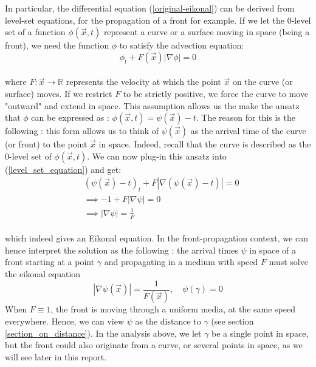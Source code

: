 \documentclass[11pt]{article}
\theoremstyle{definition}
\theoremstyle{remark}
\newcommand{\R}{\mathbb{R}}
\begin{document}
\noindent In particular, the differential equation (\ref{original-eikonal}) can be derived from level-set equations, for the propagation of a front for example. If we let the 0-level set of a function $\phi(\vec{x},t)$ represent a curve or a surface moving in space (being a front), we need the function $\phi$ to satisfy the advection equation: \\
\begin{equation}
\label{level_set_equation}
    \phi_t+F(\vec{x})|\nabla \phi| =0
\end{equation} \\
where $F:\vec{x}\rightarrow\R$ represents the velocity at which the point $\vec{x}$ on the curve (or surface) moves. If we restrict $F$ to be strictly positive, we force the curve to move "outward" and extend in space. This assumption allows us the make the ansatz that $\phi$ can be expressed as : $\phi(\vec{x},t)=\psi(\vec{x})-t$. The reason for this is the following : this form allows us to think of $\psi(\vec{x})$ as the arrival time of the curve (or front) to the point $\vec{x}$ in space. Indeed, recall that the curve is described as the 0-level set of $\phi(\vec{x},t)$. We can now plug-in this ansatz into (\ref{level_set_equation}) and get: \\
\begin{align*}
    & (\psi(\vec{x})-t)_t+F|\nabla(\psi(\vec{x})-t)|=0 \\
    &\implies-1 +F|\nabla\psi| = 0 \\
    &\implies |\nabla\psi|=\frac{1}{F}
\end{align*} \\
\noindent which indeed gives an Eikonal equation. In the front-propagation context, we can hence interpret the solution as the following : the arrival times $\psi$ in space of a front starting at a point $\gamma$ and propagating in a medium with speed $F$ must solve the eikonal equation
\begin{equation*}
    |\nabla\psi(\vec{x})|=\frac{1}{F(\vec{x})}, \quad \psi(\gamma)=0
\end{equation*}
When $F\equiv1$, the front is moving through a uniform media, at the same speed everywhere. Hence, we can view $\psi$ as the distance to $\gamma$ (see section \ref{section_on_distance}). In the analysis above, we let $\gamma$ be a single point in space, but the front could also originate from a curve, or several points in space, as we will see later in this report.
\end{document}
